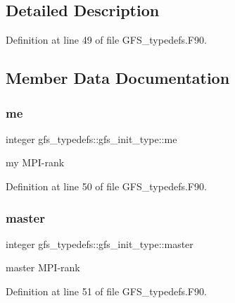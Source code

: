 

\subsection{Detailed Description}


Definition at line 49 of file G\+F\+S\+\_\+typedefs.\+F90.



\subsection{Member Data Documentation}
\mbox{\label{structgfs__typedefs_1_1gfs__init__type_af9faadadefb00562b5cc2df2b580476e}} 
\subsubsection{me}
{\footnotesize\ttfamily integer gfs\+\_\+typedefs\+::gfs\+\_\+init\+\_\+type\+::me}



my M\+P\+I-\/rank 



Definition at line 50 of file G\+F\+S\+\_\+typedefs.\+F90.

\mbox{\label{structgfs__typedefs_1_1gfs__init__type_a62cf2cdb7947cb3c3834182cee398120}} 
\subsubsection{master}
{\footnotesize\ttfamily integer gfs\+\_\+typedefs\+::gfs\+\_\+init\+\_\+type\+::master}



master M\+P\+I-\/rank 



Definition at line 51 of file G\+F\+S\+\_\+typedefs.\+F90.

\mbox{\label{structgfs__typedefs_1_1gfs__init__type_a1e9a13d50f826493a741082f278838b1}} 
